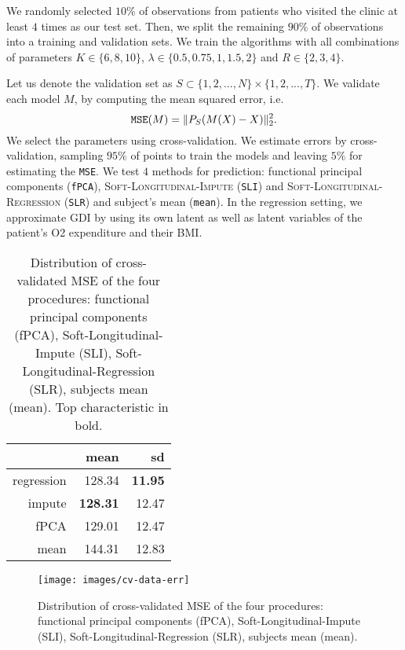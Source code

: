 \documentclass[preprint]{imsart}
\numberwithin{equation}{section}
\theoremstyle{plain}
\begin{document}
We randomly selected $10\%$ of observations from patients who visited the clinic at least $4$ times as our test set. Then, we split the remaining $90\%$ of observations into a training and validation sets. We train the algorithms with all combinations of parameters $K \in \{6,8,10\}$, $\lambda \in \{0.5, 0.75, 1, 1.5, 2\}$ and $R \in \{2,3,4\}$.

Let us denote the validation set as $S \subset \{1,2,...,N\} \times \{1,2,...,T\}$. We validate each model $M$, by computing the mean squared error, i.e.
\[
\verb|MSE|(M) = \|P_S(M(X) - X)\|_2^2.
\]
We select the parameters using cross-validation. We estimate errors by cross-validation, sampling $95\%$ of points to train the models and leaving $5\%$ for estimating the \verb|MSE|. We test $4$ methods for prediction: functional principal components (\verb|fPCA|), \textsc{Soft-Longitudinal-Impute} (\verb|SLI|) and \textsc{Soft-Longitudinal-Regression} (\verb|SLR|) and subject's mean (\verb|mean|). In the regression setting, we approximate GDI by using its own latent as well as latent variables of the patient's O2 expenditure and their BMI.

\begin{table}[ht]
\centering
\begin{tabular}{rrr}
  \hline
 & mean & sd \\ 
  \hline
regression & 128.34 & \textbf{11.95} \\ 
  impute & \textbf{128.31} & 12.47 \\ 
  fPCA & 129.01 & 12.47 \\ 
  mean & 144.31 & 12.83 \\ 
   \hline
\end{tabular}\label{tbl:data-res}
\caption{Distribution of cross-validated MSE of the four procedures: functional principal components (fPCA), Soft-Longitudinal-Impute (SLI), Soft-Longitudinal-Regression (SLR), subjects mean (mean). Top characteristic in bold.}
\end{table}

\begin{figure}[h!]
  \texttt{[image: images/cv-data-err]}
  \caption{Distribution of cross-validated MSE of the four procedures: functional principal components (fPCA), Soft-Longitudinal-Impute (SLI), Soft-Longitudinal-Regression (SLR), subjects mean (mean).}
  \label{fig:Boxplots}
\end{figure}
\end{document}
